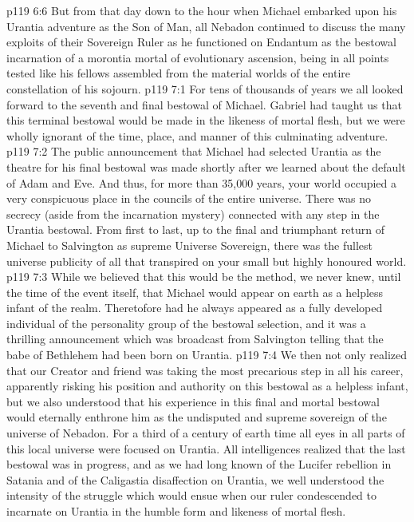 \vs p119 6:6 But from that day down to the hour when Michael embarked upon his Urantia adventure as the Son of Man, all Nebadon continued to discuss the many exploits of their Sovereign Ruler as he functioned on Endantum as the bestowal incarnation of a morontia mortal of evolutionary ascension, being in all points tested like his fellows assembled from the material worlds of the entire constellation of his sojourn.
\vs p119 7:1 For tens of thousands of years we all looked forward to the seventh and final bestowal of Michael. Gabriel had taught us that this terminal bestowal would be made in the likeness of mortal flesh, but we were wholly ignorant of the time, place, and manner of this culminating adventure.
\vs p119 7:2 The public announcement that Michael had selected Urantia as the theatre for his final bestowal was made shortly after we learned about the default of Adam and Eve. And thus, for more than 35,000 years, your world occupied a very conspicuous place in the councils of the entire universe. There was no secrecy (aside from the incarnation mystery) connected with any step in the Urantia bestowal. From first to last, up to the final and triumphant return of Michael to Salvington as supreme Universe Sovereign, there was the fullest universe publicity of all that transpired on your small but highly honoured world.
\vs p119 7:3 \pc While we believed that this would be the method, we never knew, until the time of the event itself, that Michael would appear on earth as a helpless infant of the realm. Theretofore had he always appeared as a fully developed individual of the personality group of the bestowal selection, and it was a thrilling announcement which was broadcast from Salvington telling that the babe of Bethlehem had been born on Urantia.
\vs p119 7:4 We then not only realized that our Creator and friend was taking the most precarious step in all his career, apparently risking his position and authority on this bestowal as a helpless infant, but we also understood that his experience in this final and mortal bestowal would eternally enthrone him as the undisputed and supreme sovereign of the universe of Nebadon. For a third of a century of earth time all eyes in all parts of this local universe were focused on Urantia. All intelligences realized that the last bestowal was in progress, and as we had long known of the Lucifer rebellion in Satania and of the Caligastia disaffection on Urantia, we well understood the intensity of the struggle which would ensue when our ruler condescended to incarnate on Urantia in the humble form and likeness of mortal flesh.
